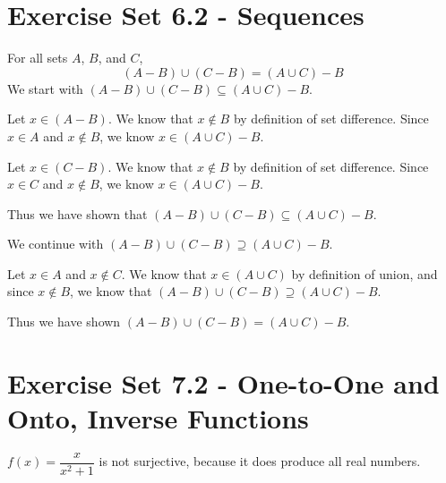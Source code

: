 \documentclass[12pt]{article}
\newenvironment{modenumerate}
  {\enumerate\setupmodenumerate}
  {\endenumerate}
\newif\ifmoditem
\newcommand{\setupmodenumerate}{%
  \global\moditemfalse
  \let\origmakelabel\makelabel
  \def\moditem##1{\global\moditemtrue\def\mesymbol{##1}\item}%
  \def\makelabel##1{%
    \origmakelabel{##1\ifmoditem\rlap{\mesymbol}\fi\enspace}%
    \global\moditemfalse}%
}
\begin{document}
\section*{Exercise Set 6.2 - Sequences}
\begin{modenumerate}
\item %
\setcounter{enumi}{6}
\item %
\item %
\moditem{*} %
For all sets $A$, $B$, and $C$, 
$$(A - B) \cup (C - B) = (A \cup C) - B$$
We start with $(A - B) \cup (C - B) \subseteq (A \cup C) - B$.

Let $x \in (A - B)$. We know that $x \not\in B$ by definition of set difference. Since $x \in A$ and $x
\not\in B$, we know $x \in (A \cup C) - B$.

Let $x \in (C - B)$. We know that $x \not\in B$ by definition of set difference. Since $x \in C$ and $x
\not\in B$, we know $x \in (A \cup C) - B$.

Thus we have shown that $(A - B) \cup (C - B) \subseteq (A \cup C) - B$.

We continue with $(A - B) \cup (C - B) \supseteq (A \cup C) - B$.

Let $x \in A$ and $x \not\in C$. We know that $x \in (A \cup C)$ by definition of union, and since $x \not\in
B$, we know that $(A - B) \cup (C - B) \supseteq (A \cup C) - B$.

Thus we have shown $(A - B) \cup (C - B) = (A \cup C) - B$.

\setcounter{enumi}{11}
\item %
\item %
\setcounter{enumi}{15}
\item %
\setcounter{enumi}{24}
\item %
\setcounter{enumi}{33}
\moditem{*} %

\end{modenumerate}
\section*{Exercise Set 7.2 - One-to-One and Onto, Inverse Functions}
\begin{modenumerate}
\setcounter{enumi}{3}
\item %
\item %
\item %
\setcounter{enumi}{14}
\item %
\moditem{*} %
$f(x) = \dfrac{x}{x^{2}+1}$ is not surjective, because it does produce all real numbers.
\setcounter{enumi}{35}
\item %
\item %
\end{modenumerate}
\end{document}
